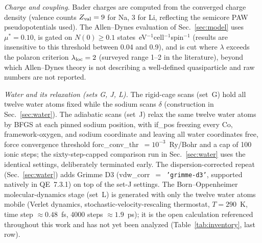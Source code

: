 \documentclass[aps,10pt,preprint,superscriptaddress,floatfix]{revtex4-2}
\begin{document}
\emph{Charge and coupling.} Bader charges are computed from the converged charge density (valence
counts $Z_{\rm val}=9$ for Na, 3 for Li, reflecting the semicore PAW pseudopotentials used). The
Allen--Dynes evaluation of Sec.~\ref{sec:model} uses $\mu^\ast=0.10$, is gated on $N(0)\geq0.1$
states~eV$^{-1}$cell$^{-1}$spin$^{-1}$ (results are insensitive to this threshold between 0.04 and
0.9), and is cut where $\lambda$ exceeds the polaron criterion $\lambda_{\rm loc}=2$ (surveyed range
1--2 in the literature), beyond which Allen--Dynes theory is not describing a well-defined
quasiparticle and raw numbers are not reported.

\emph{Water and its relaxation (sets G, J, L).} The rigid-cage scans (set~G) hold all twelve water
atoms fixed while the sodium scans $\delta$ (construction in Sec.~\ref{sec:water}). The adiabatic
scans (set~J) relax the same twelve water atoms by BFGS at each pinned sodium position, with
if\_pos freezing every Co, framework-oxygen, and sodium coordinate and leaving all water
coordinates free, force convergence threshold forc\_conv\_thr~$=10^{-3}$~Ry/Bohr and a cap of 100
ionic steps; the sixty-step-capped comparison run in Sec.~\ref{sec:water} uses the identical
settings, deliberately terminated early. The dispersion-corrected repeat (Sec.~\ref{sec:water}) adds
Grimme D3 (vdw\_corr~$=$~\texttt{'grimme-d3'}, supported natively in QE~7.3.1) on top of the set-J
settings. The Born--Oppenheimer molecular-dynamics stage (set~L) is generated with only the twelve
water atoms mobile (Verlet dynamics, stochastic-velocity-rescaling thermostat, $T=290$~K, time step
$\approx0.48$~fs, 4000 steps $\approx1.9$~ps); it is the open calculation referenced throughout this
work and has not yet been analyzed (Table~\ref{tab:inventory}, last row).
\end{document}
